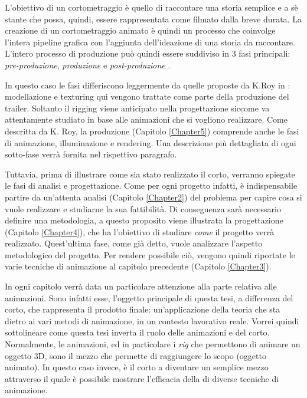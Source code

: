 L'obiettivo di un cortometraggio è quello di raccontare una storia semplice e a sè stante che possa, quindi, essere rappresentata come filmato dalla breve durata.
La creazione di un cortometraggio animato è quindi un processo che coinvolge l'intera pipeline grafica con l'aggiunta dell'ideazione di una storia da raccontare.
L'intero processo di produzione può quindi essere suddiviso in 3 fasi principali: \emph{pre-produzione}, \emph{produzione} e \emph{post-produzione} \cite{roy2014finish}.

In questo caso le fasi differiscono leggermente da quelle proposte da K.Roy in \cite{roy2014finish}: modellazione e texturing qui vengono trattate come parte della produzione del trailer.
Soltanto il rigging viene anticipato nella progettazione siccome va attentamente studiato in base alle animazioni che si vogliono realizzare.
Come descritta da K. Roy, la produzione (Capitolo \ref{Chapter5}) comprende anche le fasi di animazione, illuminazione e rendering.
Una descrizione più dettagliata di ogni sotto-fase verrà fornita nel rispettivo paragrafo.

Tuttavia, prima di illustrare come sia stato realizzato il corto, verranno spiegate le fasi di analisi e
progettazione.
Come per ogni progetto infatti, è indispensabile partire da un'attenta analisi (Capitolo \ref{Chapter2}) del problema per capire cosa si vuole realizzare e studiarne la sua fattibilità.
Di conseguenza sarà necessario definire una metodologia, a questo proposito viene illustrata la progettazione (Capitolo \ref{Chapter4}), che ha l'obiettivo di studiare \emph{come} il progetto verrà realizzato.
Quest'ultima fase, come già detto, vuole analizzare l'aspetto metodologico del progetto.
Per rendere possibile ciò, vengono quindi riportate le varie tecniche di animazione al capitolo precedente (Capitolo \ref{Chapter3}).

In ogni capitolo verrà data un particolare attenzione alla parte relativa alle animazioni.
Sono infatti esse, l'oggetto principale di questa tesi, a differenza del corto, che rappresenta il prodotto finale: un'applicazione della teoria che sta dietro ai vari metodi di animazione, in un contesto lavorativo reale.
Vorrei quindi sottolineare come questa tesi inverta il ruolo delle animazioni e del corto.
Normalmente, le animazioni, ed in particolare i \emph{rig} che permettono di animare un oggetto 3D, sono il mezzo che permette di raggiungere lo scopo (oggetto animato).
In questo caso invece, è il corto a diventare un semplice mezzo attraverso il quale è possibile mostrare l'efficacia della di diverse tecniche di animazione.


